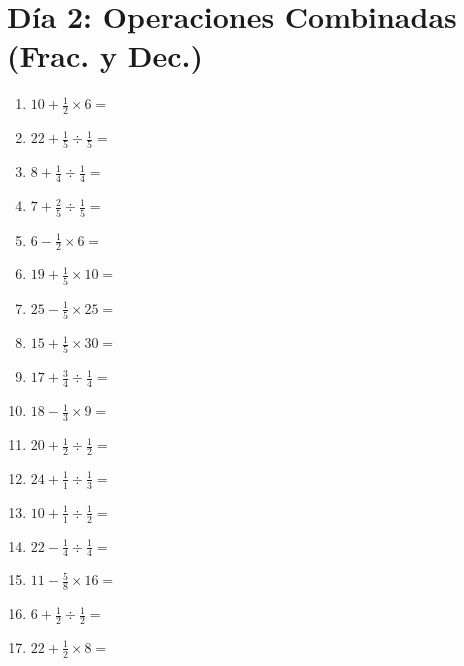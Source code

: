 \documentclass[12pt]{article}
\begin{document}
\section*{Día 2: Operaciones Combinadas (Frac. y Dec.)}
\begin{enumerate}
\item \large $ 10 + \frac{1}{2} \times 6 = $ \vspace{1.6cm}
\item \large $ 22 + \frac{1}{5} \div \frac{1}{5} = $ \vspace{1.6cm}
\item \large $ 8 + \frac{1}{4} \div \frac{1}{4} = $ \vspace{1.6cm}
\item \large $ 7 + \frac{2}{5} \div \frac{1}{5} = $ \vspace{1.6cm}
\item \large $ 6 - \frac{1}{2} \times 6 = $ \vspace{1.6cm}
\item \large $ 19 + \frac{1}{5} \times 10 = $ \vspace{1.6cm}
\item \large $ 25 - \frac{1}{5} \times 25 = $ \vspace{1.6cm}
\item \large $ 15 + \frac{1}{5} \times 30 = $ \vspace{1.6cm}
\item \large $ 17 + \frac{3}{4} \div \frac{1}{4} = $ \vspace{1.6cm}
\item \large $ 18 - \frac{1}{3} \times 9 = $ \vspace{1.6cm}
\newpage
\item \large $ 20 + \frac{1}{2} \div \frac{1}{2} = $ \vspace{1.6cm}
\item \large $ 24 + \frac{1}{1} \div \frac{1}{3} = $ \vspace{1.6cm}
\item \large $ 10 + \frac{1}{1} \div \frac{1}{2} = $ \vspace{1.6cm}
\item \large $ 22 - \frac{1}{4} \div \frac{1}{4} = $ \vspace{1.6cm}
\item \large $ 11 - \frac{5}{8} \times 16 = $ \vspace{1.6cm}
\item \large $ 6 + \frac{1}{2} \div \frac{1}{2} = $ \vspace{1.6cm}
\item \large $ 22 + \frac{1}{2} \times 8 = $ \vspace{1.6cm}

\end{enumerate}
\end{document}
